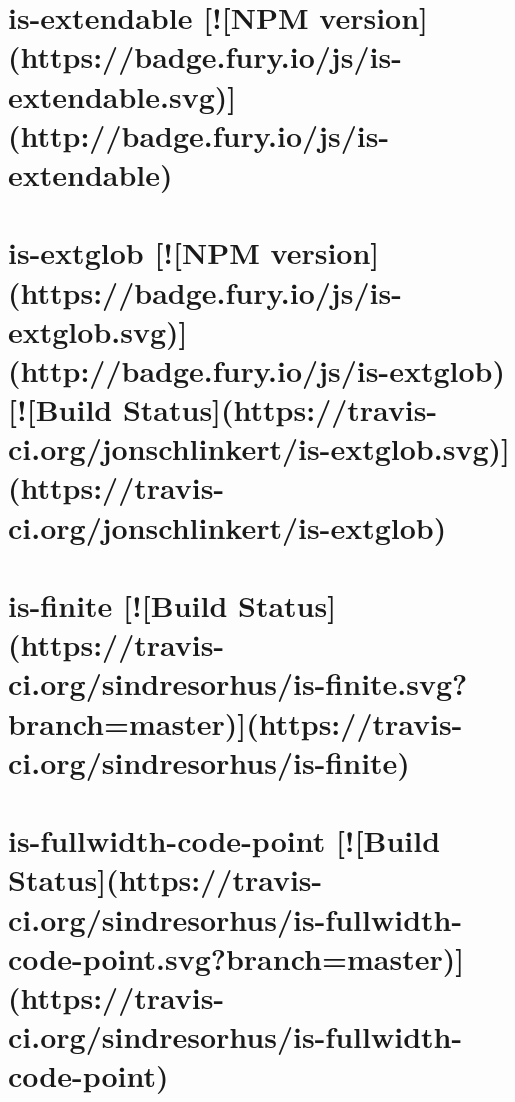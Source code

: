 \documentclass[twoside]{book}
\newcommand{\+}{\discretionary{\mbox{\scriptsize$\hookleftarrow$}}{}{}}
\begin{document}
\chapter{is-\/extendable \mbox{[}!\mbox{[}N\+PM version\mbox{]}(https\+://badge.fury.\+io/js/is-\/extendable.svg)\mbox{]}(http\+://badge.fury.\+io/js/is-\/extendable)}
\label{md__c_1_workspace_demo_src_main_script_node_modules_is-extendable__r_e_a_d_m_e}

\chapter{is-\/extglob \mbox{[}!\mbox{[}N\+PM version\mbox{]}(https\+://badge.fury.\+io/js/is-\/extglob.svg)\mbox{]}(http\+://badge.fury.\+io/js/is-\/extglob) \mbox{[}!\mbox{[}Build Status\mbox{]}(https\+://travis-\/ci.org/jonschlinkert/is-\/extglob.svg)\mbox{]}(https\+://travis-\/ci.org/jonschlinkert/is-\/extglob)}
\label{md__c_1_workspace_demo_src_main_script_node_modules_is-extglob__r_e_a_d_m_e}

\chapter{is-\/finite \mbox{[}!\mbox{[}Build Status\mbox{]}(https\+://travis-\/ci.org/sindresorhus/is-\/finite.svg?branch=master)\mbox{]}(https\+://travis-\/ci.org/sindresorhus/is-\/finite)}
\label{md__c_1_workspace_demo_src_main_script_node_modules_is-finite_readme}

\chapter{is-\/fullwidth-\/code-\/point \mbox{[}!\mbox{[}Build Status\mbox{]}(https\+://travis-\/ci.org/sindresorhus/is-\/fullwidth-\/code-\/point.svg?branch=master)\mbox{]}(https\+://travis-\/ci.org/sindresorhus/is-\/fullwidth-\/code-\/point)}
\label{md__c_1_workspace_demo_src_main_script_node_modules_is-fullwidth-code-point_readme}

\end{document}
